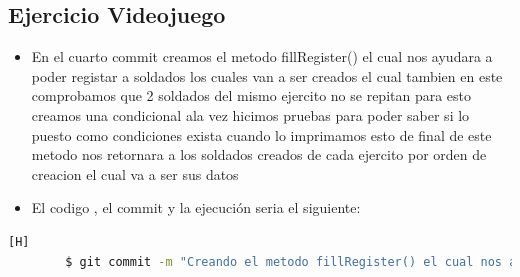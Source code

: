 \documentclass{article}
\begin{document}
	\subsection{Ejercicio Videojuego}
	\begin{itemize}	
		\item En el cuarto commit creamos el metodo fillRegister() el cual nos ayudara a poder registar a soldados los cuales van a ser creados el cual tambien en este comprobamos que 2 soldados del mismo ejercito no se repitan para esto creamos una condicional ala vez hicimos pruebas para poder saber si lo puesto como condiciones exista cuando lo imprimamos esto de final de este metodo nos retornara a los soldados creados de cada ejercito por orden de creacion el cual va a ser sus datos
		\item El codigo , el commit y la ejecución seria el siguiente:
	\end{itemize}	
	\begin{lstlisting}[language=bash,caption={Commit}][H]
		$ git commit -m "Creando el metodo fillRegister() el cual nos ayudara a poder registar a soldados los cuales van a ser creados el cual tambien en este comprobamos que 2 soldados del mismo ejercito no se repitan para esto creamos una condicional ala vez hicimos pruebas para poder saber si lo puesto como condiciones exista cuando lo imprimamos esto de final de este metodo nos retornara a los soldados creados de cada ejercito por orden de creacion el cual va a ser sus datos"
	\end{lstlisting}	
\end{document}
